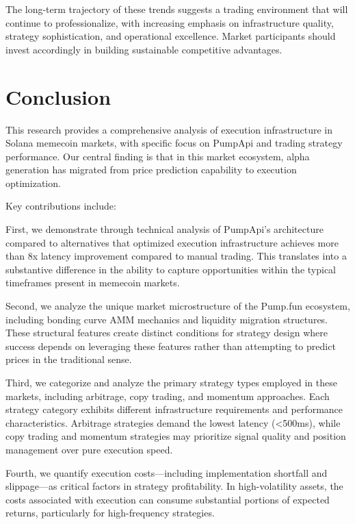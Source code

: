 \documentclass[12pt,a4paper]{article}
\begin{document}
The long-term trajectory of these trends suggests a trading environment that will continue to professionalize, with increasing emphasis on infrastructure quality, strategy sophistication, and operational excellence. Market participants should invest accordingly in building sustainable competitive advantages.

\section{Conclusion}

This research provides a comprehensive analysis of execution infrastructure in Solana memecoin markets, with specific focus on PumpApi and trading strategy performance. Our central finding is that in this market ecosystem, alpha generation has migrated from price prediction capability to execution optimization.

Key contributions include:

First, we demonstrate through technical analysis of PumpApi's architecture compared to alternatives that optimized execution infrastructure achieves more than 8x latency improvement compared to manual trading. This translates into a substantive difference in the ability to capture opportunities within the typical timeframes present in memecoin markets.

Second, we analyze the unique market microstructure of the Pump.fun ecosystem, including bonding curve AMM mechanics and liquidity migration structures. These structural features create distinct conditions for strategy design where success depends on leveraging these features rather than attempting to predict prices in the traditional sense.

Third, we categorize and analyze the primary strategy types employed in these markets, including arbitrage, copy trading, and momentum approaches. Each strategy category exhibits different infrastructure requirements and performance characteristics. Arbitrage strategies demand the lowest latency (<500ms), while copy trading and momentum strategies may prioritize signal quality and position management over pure execution speed.

Fourth, we quantify execution costs—including implementation shortfall and slippage—as critical factors in strategy profitability. In high-volatility assets, the costs associated with execution can consume substantial portions of expected returns, particularly for high-frequency strategies.
\end{document}

